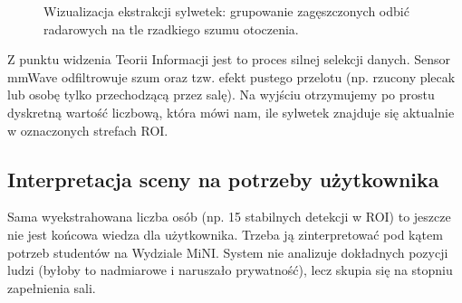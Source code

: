 \documentclass[14pt,a4paper]{extarticle}
\begin{document}
\begin{figure}[H]
    \centering
    \caption{Wizualizacja ekstrakcji sylwetek: grupowanie zagęszczonych odbić radarowych na tle rzadkiego szumu otoczenia.}
    \label{fig:mmwave_clusters}
\end{figure}

Z punktu widzenia Teorii Informacji jest to proces silnej selekcji danych. Sensor mmWave odfiltrowuje szum oraz tzw. efekt pustego przelotu (np. rzucony plecak lub osobę tylko przechodzącą przez salę). Na wyjściu otrzymujemy po prostu dyskretną wartość liczbową, która mówi nam, ile sylwetek znajduje się aktualnie w oznaczonych strefach ROI.

\subsection{Interpretacja sceny na potrzeby użytkownika}
Sama wyekstrahowana liczba osób (np. 15 stabilnych detekcji w ROI) to jeszcze nie jest końcowa wiedza dla użytkownika. Trzeba ją zinterpretować pod kątem potrzeb studentów na Wydziale MiNI. System nie analizuje dokładnych pozycji ludzi (byłoby to nadmiarowe i naruszało prywatność), lecz skupia się na stopniu zapełnienia sali.
\end{document}
